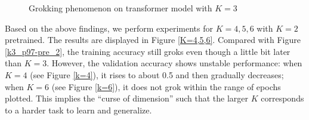 \documentclass[UTF8]{article}
\begin{document}
\begin{figure}[H]
  \centering
  \caption{Grokking phenomenon on transformer model with $K=3$}
  \label{K=3} 
\end{figure}

Based on the above findings, we perform experiments for $K=4,5,6$ with $K=2$ pretrained. The results are displayed in Figure \ref{K=4,5,6}. Compared with Figure \ref{k3_p97-pre_2}, the training accuracy still groks even though a little bit later than $K=3$. However, the validation accuracy shows unstable performance: when $K=4$ (see Figure \ref{k=4}), it rises to about 0.5 and then gradually decreases; when $K=6$ (see Figure \ref{k=6}), it does not grok within the range of epochs plotted. This implies the ``curse of dimension'' such that the larger $K$ corresponds to a harder task to learn and generalize.
\end{document}
